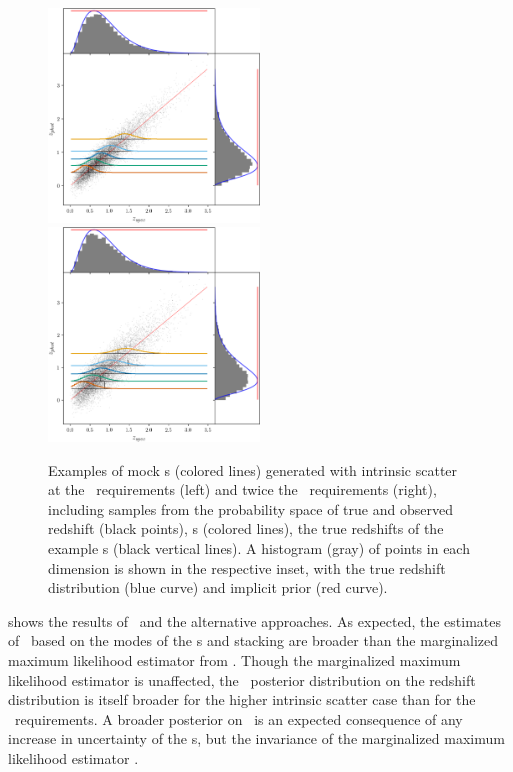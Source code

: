 \begin{figure}
	\includegraphics[width=0.5\textwidth]{figures/chippr/samplepzs_scatter1.png}
	\includegraphics[width=0.5\textwidth]{figures/chippr/samplepzs_scatter2.png}
	\caption{
		Examples of mock \pzpdf s (colored lines) generated with intrinsic scatter at the \lsst\ requirements (left) and twice the \lsst\ requirements (right), including samples from the probability space of true and observed redshift (black points), \pzpdf s (colored lines), the true redshifts of the example \pzpdf s (black vertical lines).
		A histogram (gray) of points in each dimension is shown in the respective inset, with the true redshift distribution (blue curve) and implicit prior (red curve).
	}
\end{figure}

 shows the results of \Chippr\ and the alternative approaches.
As expected, the estimates of \nz\ based on the modes of the \pzpdf s and stacking are broader than the marginalized maximum likelihood estimator from \chippr.
Though the marginalized maximum likelihood estimator is unaffected, the \Chippr\ posterior distribution on the redshift distribution is itself broader for the higher intrinsic scatter case than for the \lsst\ requirements.
A broader posterior on \nz\ is an expected consequence of any increase in uncertainty of the \pzpdf s, but the invariance of the marginalized maximum likelihood estimator .

